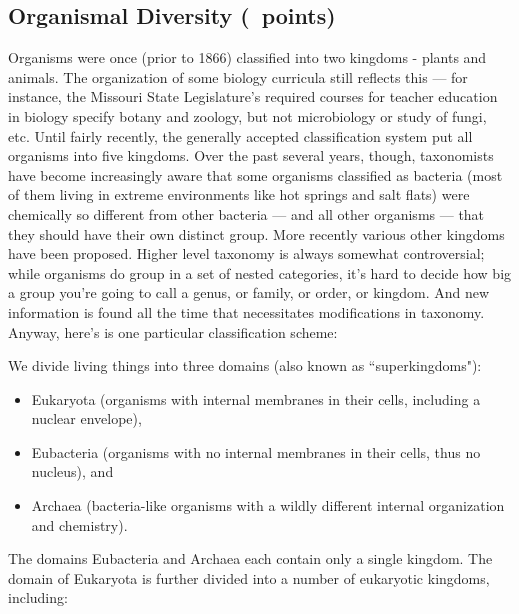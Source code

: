 \documentclass[11pt, addpoints]{exam}
\begin{document}
\subsection*{Organismal Diversity (\numpoints\ points)}

Organisms were once (prior to 1866) classified into two kingdoms -
plants and animals. The organization of some biology curricula still
reflects this — for instance, the Missouri State Legislature's
required courses for teacher education in biology specify botany and
zoology, but not microbiology or study of fungi, etc. Until fairly
recently, the generally accepted classification system put all organisms
into five kingdoms. Over the past several years, though, taxonomists
have become increasingly aware that some organisms classified as
bacteria (most of them living in extreme environments like hot springs
and salt flats) were chemically so different from other bacteria —
and all other organisms — that they should have their own distinct
group. More recently various other kingdoms have been proposed. Higher
level taxonomy is always somewhat controversial; while organisms do
group in a set of nested categories, it's hard to decide how big a group
you're going to call a genus, or family, or order, or kingdom. And new
information is found all the time that necessitates modifications in
taxonomy. Anyway, here's is one particular classification scheme:

We divide living things into three domains (also known as
“superkingdoms"):

\begin{itemize}
\item
  Eukaryota (organisms with internal membranes in their cells, including
  a nuclear envelope),
\item
  Eubacteria (organisms with no internal membranes in their cells, thus
  no nucleus), and
\item
  Archaea (bacteria-like organisms with a wildly different internal
  organization and chemistry).
\end{itemize}

\noindent The domains Eubacteria and Archaea each contain only a single kingdom. 
The domain of Eukaryota is further divided into a number of eukaryotic
kingdoms, including:
\end{document}
